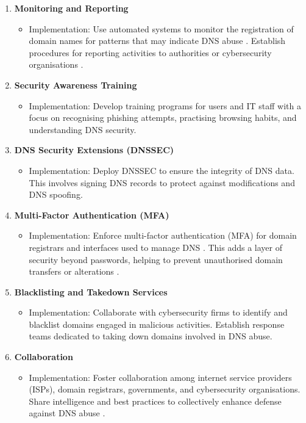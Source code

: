 \begin{enumerate}
    \item \textbf{Monitoring and Reporting}
    \begin{itemize}
        \item Implementation: Use automated systems to monitor the registration of domain names for patterns that may indicate DNS abuse \cite{icannndnssec}. Establish procedures for reporting activities to authorities or cybersecurity organisations \cite{lucas2021tls}.
    \end{itemize}
    \item \textbf{Security Awareness Training}
    \begin{itemize}
        \item Implementation: Develop training programs for users and IT staff with a focus on recognising phishing attempts, practising browsing habits, and understanding DNS security.
    \end{itemize}
    \item \textbf{DNS Security Extensions (DNSSEC)}
    \begin{itemize}
        \item Implementation: Deploy DNSSEC to ensure the integrity of DNS data. This involves signing DNS records to protect against modifications and DNS spoofing.
    \end{itemize}
    \item \textbf{Multi-Factor Authentication (MFA)}
    \begin{itemize}
        \item Implementation: Enforce multi-factor authentication (MFA) for domain registrars and interfaces used to manage DNS \cite{icannndnssec}. This adds a layer of security beyond passwords, helping to prevent unauthorised domain transfers or alterations \cite{moghaddam2014ecco}.
    \end{itemize}
    \item \textbf{Blacklisting and Takedown Services}
    \begin{itemize}
        \item Implementation: Collaborate with cybersecurity firms to identify and blacklist domains engaged in malicious activities. Establish response teams dedicated to taking down domains involved in DNS abuse.
    \end{itemize}
    \item \textbf{Collaboration}
    \begin{itemize}
        \item Implementation: Foster collaboration among internet service providers (ISPs), domain registrars, governments, and cybersecurity organisations. Share intelligence and best practices to collectively enhance defense against DNS abuse \cite{skopik2017collaborative}.

\end{itemize}
\end{enumerate}

